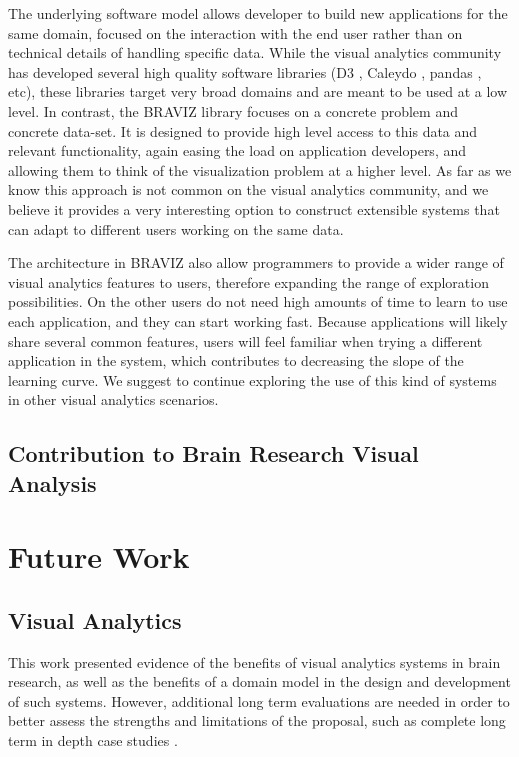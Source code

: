 {The underlying software model allows developer to build new applications for the same domain, focused on the interaction with the end user rather than on technical details of handling specific data. While the visual analytics community has developed several high quality software libraries (D3 \autocite{bostock_d3_2011}, Caleydo \autocite{}, pandas \autocite{}, etc), these libraries target very broad domains and are meant to be used at a low level. In contrast, the BRAVIZ library focuses on a concrete problem and concrete data-set. It is designed to provide high level access to this data and relevant functionality, again easing the load on application developers, and allowing them to think of the visualization problem at a higher level. As far as we know this approach is not common on the visual analytics community, and we believe it provides a very interesting option to construct extensible systems that can adapt to different users working on the same data. 

The architecture in BRAVIZ also allow programmers to provide a wider range of visual analytics features to users, therefore expanding the range of exploration possibilities. On the other users do not need high amounts of time to learn to use each application, and they can start working fast. Because applications will likely share several common features, users will feel familiar when trying a different application in the system, which contributes to decreasing the slope of the learning curve. We suggest to continue exploring the use of this kind of systems in other visual analytics scenarios.


\subsection{Contribution to Brain Research Visual Analysis }


\section{Future Work}

\subsection{Visual Analytics}
This work presented evidence of the benefits of visual analytics systems in brain research, as well as the benefits of a domain model in the design and development of such systems. However, additional long term evaluations are needed in order to better assess the strengths and limitations of the proposal, such as complete long term in depth case studies \autocite{shneiderman_strategies_2006}. 

}

